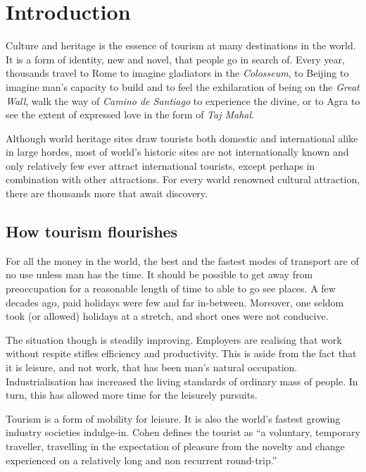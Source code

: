 \chapter{Introduction} %
\label{cha:intro}


Culture and heritage is the essence of tourism at many destinations in the world. It is a form of identity, new and novel, that people go in search of. Every year, thousands travel to Rome to imagine gladiators in the \emph{Colosseum}, to Beijing to imagine man's capacity to build and to feel the exhilaration of being on the \emph{Great Wall}, walk the way of \emph{Camino de Santiago} to experience the divine, or to Agra to see the extent of expressed love in the form of \emph{Taj Mahal}.

Although world heritage sites draw tourists both domestic and international alike in large hordes, most of world's historic sites are not internationally known and only relatively few ever attract international tourists, except perhaps in combination with other attractions. For every world renowned cultural attraction, there are thousands more that await discovery.

\section{How tourism flourishes} %
\label{sec:htf}

For all the money in the world, the best and the fastest modes of transport are of no use unless man has the time. It should be possible to get away from preoccupation for a reasonable length of time to able to go see places. A few decades ago, paid holidays were few and far in-between. Moreover, one seldom took (or allowed) holidays at a stretch, and short ones were not conducive.

The situation though is steadily improving. Employers are realising that work without respite stifles efficiency and productivity. This is aside from the fact that it is leisure, and not work, that has been man's natural occupation. Industrialisation has increased the living standards of ordinary mass of people. In turn, this has allowed more time for the leisurely pursuits.

Tourism is a form of mobility for leisure. It is also the world's fastest growing industry societies indulge-in. Cohen defines the tourist as ``a voluntary, temporary traveller, travelling in the expectation of pleasure from the novelty and change experienced on a relatively long and non recurrent round-trip.''

